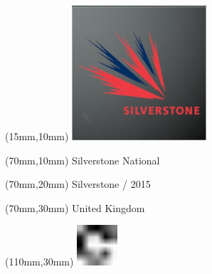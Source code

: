 \null\newpage
\begin{textblock*}{50mm}(15mm,10mm)%
\includegraphics[width=50mm]{LG/2015-05-20_00094.png}
\end{textblock*}
\begin{textblock*}{130mm}(70mm,10mm)%
{\fontsize{20}{20}\selectfont Silverstone National}\\
\end{textblock*}
\begin{textblock*}{120mm}(70mm,20mm)%
{\fontsize{16}{16}\selectfont Silverstone / 2015}\\
\end{textblock*}
\begin{textblock*}{120mm}(70mm,30mm)%
{\fontsize{12}{12}\selectfont United Kingdom}
\end{textblock*}
\begin{textblock*}{30mm}(110mm,30mm)%
\centering
\includegraphics[height=15mm]{icons/fa-rotate-right.pdf}
\end{textblock*}
